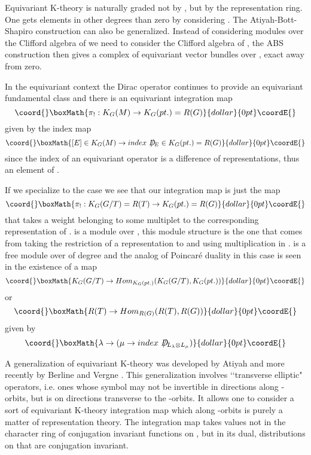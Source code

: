 \documentclass[a4paper,a4paper]{article}
\theoremstyle{conjecture}
\def\Slash#1{#1\!\!\!\!/}
\def\Dirac{\Slash D}
\begin{document}
Equivariant K-theory is naturally graded not by \coordHE{}, but by the representation ring. One gets elements
in other degrees than zero by considering \coordHE{}. The 
Atiyah-Bott-Shapiro construction can also be generalized. Instead of considering modules over
the Clifford algebra of \coordHE{} we need to consider the Clifford algebra of \coordHE{}, the ABS construction
then gives a complex of equivariant vector bundles over \coordHE{}, exact away from zero.   

In the equivariant context the Dirac operator continues to provide an equivariant fundamental class and
there is an equivariant integration map
$$\coord{}\boxMath{\pi_!:K_G(M)\rightarrow K_G(pt.)=R(G)}{dollar}{0pt}\coordE{}$$
given by the index map
$$\coord{}\boxMath{ [E]\in K_G(M)\rightarrow index\ \Dirac _E \in K_G(pt.)=R(G)}{dollar}{0pt}\coordE{}$$
since the index of an equivariant operator is a difference of representations, thus an element of \coordHE{}.

If we specialize to the case \coordHE{} we see that our integration map is just the map
$$\coord{}\boxMath{\pi_!:K_G(G/T)=R(T)\rightarrow K_G(pt.)=R(G)}{dollar}{0pt}\coordE{}$$
that takes a weight belonging to some multiplet to the corresponding representation of \coordHE{}.
\coordHE{} is a module over \coordHE{}, this module structure is the one that comes from taking
the restriction of a \coordHE{} representation to \coordHE{} and using multiplication in \coordHE{}.  \coordHE{} is a free module 
over \coordHE{} of degree \coordHE{} and the analog of Poincar\'e duality in this case is seen in the
existence of a map
$$\coord{}\boxMath{K_G(G/T)\rightarrow Hom_{K_G(pt.)}(K_G(G/T),K_G(pt.))}{dollar}{0pt}\coordE{}$$
or
$$\coord{}\boxMath{R(T)\rightarrow Hom_{R(G)}(R(T),R(G))}{dollar}{0pt}\coordE{}$$
given by
$$\coord{}\boxMath{\lambda\rightarrow (\mu\rightarrow index\ \Dirac_{L_\lambda\otimes L_\mu})}{dollar}{0pt}\coordE{}$$

A generalization of equivariant K-theory was developed by Atiyah \cite{Atiyah2} and
more recently by Berline and Vergne \cite{BV1,BV2}.  
This generalization involves \lq\lq transverse elliptic" operators, i.e. ones whose symbol
may not be invertible in directions along \coordHE{}-orbits, but is on directions transverse to
the \coordHE{}-orbits.  It allows one to consider a sort of equivariant K-theory integration map
which along \coordHE{}-orbits is purely a matter of representation theory.
The integration map takes values not in the character ring \coordHE{}
of conjugation invariant functions on \coordHE{}, but in its dual, distributions on \coordHE{} that
are conjugation invariant.
\end{document}
